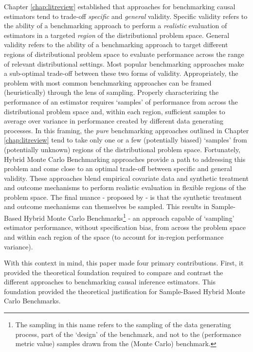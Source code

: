 \documentclass[../main.tex]{subfiles}
\begin{document}
Chapter \ref{chap:litreview} established that approaches for benchmarking causal estimators tend to trade-off \textit{specific} and \textit{general} validity. Specific validity refers to the ability of a benchmarking approach to perform a \textit{realistic} evaluation of estimators in a targeted \textit{region} of the distributional problem space. General validity refers to the ability of a benchmarking approach to target different regions of distributional problem space to evaluate performance across the range of relevant distributional settings. Most popular benchmarking approaches make a sub-optimal trade-off between these two forms of validity. Appropriately, the problem with most common benchmarking approaches can be framed (heuristically) through the lens of sampling. Properly characterizing the performance of an estimator requires `samples' of performance from across the distributional problem space and, within each region, sufficient samples to average over variance in performance created by different data generating processes. In this framing, the \textit{pure} benchmarking approaches outlined in Chapter \ref{chap:litreview} tend to take only one or a few (potentially biased) `samples' from (potentially unknown) regions of the distributional problem space. Fortunately, Hybrid Monte Carlo Benchmarking approaches provide a path to addressing this problem and come close to an optimal trade-off between specific and general validity. These approaches blend empirical covariate data and synthetic treatment and outcome mechanisms to perform realistic evaluation in flexible regions of the problem space. The final nuance - proposed by \textcite{Dorie2019Automated1} - is that the synthetic treatment and outcome mechanisms can themselves be sampled. This results in Sample-Based Hybrid Monte Carlo Benchmarks\footnote{The sampling in this name refers to the sampling of the data generating process, part of the `design' of the benchmark, and not to the (performance metric value) samples drawn from the (Monte Carlo) benchmark.} - an approach capable of `sampling' estimator performance, without specification bias, from across the problem space and within each region of the space (to account for in-region performance variance).


With this context in mind, this paper made four primary contributions. First, it provided the theoretical foundation required to compare and contrast the different approaches to benchmarking causal inference estimators. This foundation provided the theoretical justification for Sample-Based Hybrid Monte Carlo Benchmarks.
\end{document}
